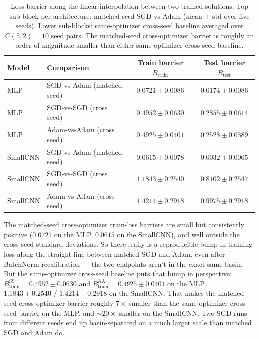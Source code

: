 \documentclass[11pt]{article}
\begin{document}
\begin{table}[H]
\centering
\small
\begin{tabular}{llcc}
\toprule
\textbf{Model} & \textbf{Comparison} & \textbf{Train barrier $B_{\text{train}}$} & \textbf{Test barrier $B_{\text{test}}$} \\
\midrule
MLP      & SGD-vs-Adam (matched seed)   & $0.0721 \pm 0.0086$ & $0.0174 \pm 0.0086$ \\
MLP      & SGD-vs-SGD (cross seed)      & $0.4952 \pm 0.0630$ & $0.2855 \pm 0.0614$ \\
MLP      & Adam-vs-Adam (cross seed)    & $0.4925 \pm 0.0401$ & $0.2528 \pm 0.0389$ \\
\addlinespace
SmallCNN & SGD-vs-Adam (matched seed)   & $0.0615 \pm 0.0078$ & $0.0032 \pm 0.0065$ \\
SmallCNN & SGD-vs-SGD (cross seed)      & $1.1843 \pm 0.2540$ & $0.8102 \pm 0.2547$ \\
SmallCNN & Adam-vs-Adam (cross seed)    & $1.4214 \pm 0.2918$ & $0.9975 \pm 0.2918$ \\
\bottomrule
\end{tabular}
\caption{Loss barrier along the linear interpolation between two trained solutions. Top sub-block per architecture: matched-seed SGD-vs-Adam (mean $\pm$ std over five seeds). Lower sub-blocks: same-optimizer cross-seed baseline averaged over $C(5,2)=10$ seed pairs. The matched-seed cross-optimizer barrier is roughly an order of magnitude smaller than either same-optimizer cross-seed baseline.}
\label{tab:mode-connectivity}
\end{table}

The matched-seed cross-optimizer train-loss barriers are small but consistently positive ($0.0721$ on the MLP, $0.0615$ on the SmallCNN), and well outside the cross-seed standard deviations. So there really is a reproducible bump in training loss along the straight line between matched SGD and Adam, even after BatchNorm recalibration --- the two endpoints aren't in the exact same basin. But the same-optimizer cross-seed baseline puts that bump in perspective: $B_{\text{train}}^{\mathrm{SS}} = 0.4952 \pm 0.0630$ and $B_{\text{train}}^{\mathrm{AA}} = 0.4925 \pm 0.0401$ on the MLP, $1.1843 \pm 0.2540$ / $1.4214 \pm 0.2918$ on the SmallCNN. That makes the matched-seed cross-optimizer barrier roughly $7\times$ smaller than the same-optimizer cross-seed barrier on the MLP, and $\sim 20\times$ smaller on the SmallCNN. Two SGD runs from different seeds end up basin-separated on a much larger scale than matched SGD and Adam do.
\end{document}
